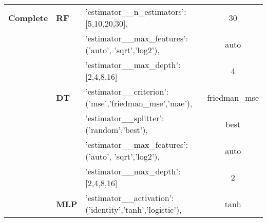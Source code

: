 \begin{table}[]
\begin{tabular}{lllc}
\multicolumn{1}{l|}{\textbf{Complete}}   & \multicolumn{1}{l|}{\textbf{RF}}            & \multicolumn{1}{l|}{'estimator\_\_n\_estimators':{[}5,10,20,30{]},}                                                                                         & \multicolumn{1}{c|}{30}            \\ \cline{2-4}
\multicolumn{1}{l|}{\textbf{}}           & \multicolumn{1}{l|}{\textbf{}}              & \multicolumn{1}{l|}{'estimator\_\_max\_features':('auto', 'sqrt','log2'),}                                                                                  & \multicolumn{1}{c|}{auto}          \\ \cline{2-4}
\multicolumn{1}{l|}{\textbf{}}           & \multicolumn{1}{l|}{\textbf{}}              & \multicolumn{1}{l|}{'estimator\_\_max\_depth':{[}2,4,8,16{]}}                                                                                               & \multicolumn{1}{c|}{4}             \\ \cline{2-4}
\multicolumn{1}{l|}{\textbf{}}           & \multicolumn{1}{l|}{\textbf{DT}}            & \multicolumn{1}{l|}{'estimator\_\_criterion':('mse','friedman\_mse','mae'),}                                                                                & \multicolumn{1}{c|}{friedman\_mse} \\ \cline{2-4}
\multicolumn{1}{l|}{\textbf{}}           & \multicolumn{1}{l|}{\textbf{}}              & \multicolumn{1}{l|}{'estimator\_\_splitter':('random','best'),}                                                                                             & \multicolumn{1}{c|}{best}          \\ \cline{2-4}
\multicolumn{1}{l|}{\textbf{}}           & \multicolumn{1}{l|}{\textbf{}}              & \multicolumn{1}{l|}{'estimator\_\_max\_features':('auto', 'sqrt','log2'),}                                                                                  & \multicolumn{1}{c|}{auto}          \\ \cline{2-4}
\multicolumn{1}{l|}{\textbf{}}           & \multicolumn{1}{l|}{\textbf{}}              & \multicolumn{1}{l|}{'estimator\_\_max\_depth':{[}2,4,8,16{]}}                                                                                               & \multicolumn{1}{c|}{2}             \\ \cline{2-4}
\multicolumn{1}{l|}{\textbf{}}           & \multicolumn{1}{l|}{\textbf{MLP}}           & \multicolumn{1}{l|}{'estimator\_\_activation':('identity','tanh','logistic'),}                                                                              & \multicolumn{1}{c|}{tanh}          \\ \cline{2-4}

\end{tabular}
\end{table}
